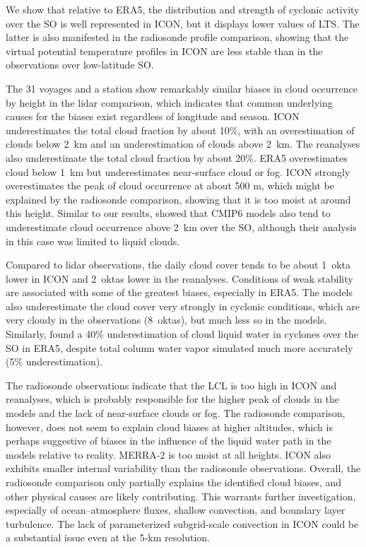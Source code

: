 \documentclass[draft]{agujournal2019}
\begin{document}
We show that relative to ERA5, the distribution and strength of cyclonic activity over the SO is well represented in ICON, but it displays lower values of LTS. The latter is also manifested in the radiosonde profile comparison, showing that the virtual potential temperature profiles in ICON are less stable than in the observations over low-latitude SO.

The 31 voyages and a station show remarkably similar biases in cloud occurrence by height in the lidar comparison, which indicates that common underlying causes for the biases exist regardless of longitude and season. ICON underestimates the total cloud fraction by about 10\%, with an overestimation of clouds below 2~km and an underestimation of clouds above 2~km. The reanalyses also underestimate the total cloud fraction by about 20\%. ERA5 overestimates cloud below 1~km but underestimates near-surface cloud or fog. ICON strongly overestimates the peak of cloud occurrence at about 500 m, which might be explained by the radiosonde comparison, showing that it is too moist at around this height. Similar to our results,  showed that CMIP6 models also tend to underestimate cloud occurrence above 2~km over the SO, although their analysis in this case was limited to liquid clouds.

Compared to lidar observations, the daily cloud cover tends to be about 1~okta lower in ICON and 2~oktas lower in the reanalyses. Conditions of weak stability are associated with some of the greatest biases, especially in ERA5. The models also underestimate the cloud cover very strongly in cyclonic conditions, which are very cloudy in the observations (8~oktas), but much less so in the models. Similarly,  found a 40\% underestimation of cloud liquid water in cyclones over the SO in ERA5, despite total column water vapor simulated much more accurately (5\% underestimation).

The radiosonde observations indicate that the LCL is too high in ICON and reanalyses, which is probably responsible for the higher peak of clouds in the models and the lack of near-surface clouds or fog. The radiosonde comparison, however, does not seem to explain cloud biases at higher altitudes, which is perhaps suggestive of biases in the influence of the liquid water path in the models relative to reality. MERRA-2 is too moist at all heights. ICON also exhibits smaller internal variability than the radiosonde observations. Overall, the radiosonde comparison only partially explains the identified cloud biases, and other physical causes are likely contributing. This warrants further investigation, especially of ocean--atmosphere fluxes, shallow convection, and boundary layer turbulence. The lack of parameterized subgrid-scale convection in ICON could be a substantial issue even at the 5-km resolution.
\end{document}
